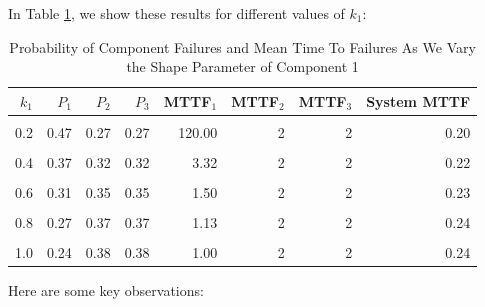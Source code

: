 \documentclass[
]{article}
\begin{document}
In Table \ref{tab:table-vary-k1}, we show these results for different
values of \(k_1\):

\begin{table}

\caption{\label{tab:table-vary-k1}Probability of Component Failures and Mean Time To Failures As We Vary the Shape Parameter of Component 1}
\centering
\begin{tabular}[t]{r|r|r|r|r|r|r|r}
\hline
$k_1$ & $P_1$ & $P_2$ & $P_3$ & MTTF$_1$ & MTTF$_2$ & MTTF$_3$ & System MTTF\\
\hline
\cellcolor{gray!6}{0.1} & \cellcolor{gray!6}{0.54} & \cellcolor{gray!6}{0.23} & \cellcolor{gray!6}{0.23} & \cellcolor{gray!6}{3628800.00} & \cellcolor{gray!6}{2} & \cellcolor{gray!6}{2} & \cellcolor{gray!6}{0.19}\\
\hline
0.2 & 0.47 & 0.27 & 0.27 & 120.00 & 2 & 2 & 0.20\\
\hline
\cellcolor{gray!6}{0.3} & \cellcolor{gray!6}{0.41} & \cellcolor{gray!6}{0.29} & \cellcolor{gray!6}{0.29} & \cellcolor{gray!6}{9.26} & \cellcolor{gray!6}{2} & \cellcolor{gray!6}{2} & \cellcolor{gray!6}{0.21}\\
\hline
0.4 & 0.37 & 0.32 & 0.32 & 3.32 & 2 & 2 & 0.22\\
\hline
\cellcolor{gray!6}{0.5} & \cellcolor{gray!6}{0.33} & \cellcolor{gray!6}{0.33} & \cellcolor{gray!6}{0.33} & \cellcolor{gray!6}{2.00} & \cellcolor{gray!6}{2} & \cellcolor{gray!6}{2} & \cellcolor{gray!6}{0.22}\\
\hline
0.6 & 0.31 & 0.35 & 0.35 & 1.50 & 2 & 2 & 0.23\\
\hline
\cellcolor{gray!6}{0.7} & \cellcolor{gray!6}{0.29} & \cellcolor{gray!6}{0.36} & \cellcolor{gray!6}{0.36} & \cellcolor{gray!6}{1.27} & \cellcolor{gray!6}{2} & \cellcolor{gray!6}{2} & \cellcolor{gray!6}{0.23}\\
\hline
0.8 & 0.27 & 0.37 & 0.37 & 1.13 & 2 & 2 & 0.24\\
\hline
\cellcolor{gray!6}{0.9} & \cellcolor{gray!6}{0.25} & \cellcolor{gray!6}{0.37} & \cellcolor{gray!6}{0.37} & \cellcolor{gray!6}{1.05} & \cellcolor{gray!6}{2} & \cellcolor{gray!6}{2} & \cellcolor{gray!6}{0.24}\\
\hline
1.0 & 0.24 & 0.38 & 0.38 & 1.00 & 2 & 2 & 0.24\\
\hline
\end{tabular}
\end{table}

Here are some key observations:
\end{document}
